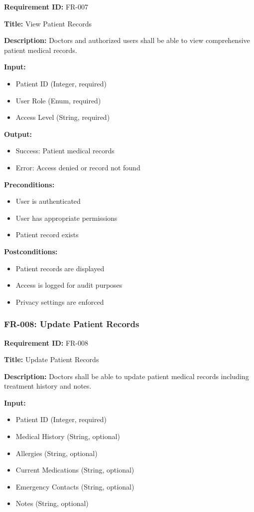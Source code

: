 \documentclass[12pt,a4paper]{article}
\begin{document}
\textbf{Requirement ID:} FR-007

\textbf{Title:} View Patient Records

\textbf{Description:} Doctors and authorized users shall be able to view comprehensive patient medical records.

\textbf{Input:}
\begin{itemize}
    \item Patient ID (Integer, required)
    \item User Role (Enum, required)
    \item Access Level (String, required)
\end{itemize}

\textbf{Output:}
\begin{itemize}
    \item Success: Patient medical records
    \item Error: Access denied or record not found
\end{itemize}

\textbf{Preconditions:}
\begin{itemize}
    \item User is authenticated
    \item User has appropriate permissions
    \item Patient record exists
\end{itemize}

\textbf{Postconditions:}
\begin{itemize}
    \item Patient records are displayed
    \item Access is logged for audit purposes
    \item Privacy settings are enforced
\end{itemize}

\subsubsection{FR-008: Update Patient Records}

\textbf{Requirement ID:} FR-008

\textbf{Title:} Update Patient Records

\textbf{Description:} Doctors shall be able to update patient medical records including treatment history and notes.

\textbf{Input:}
\begin{itemize}
    \item Patient ID (Integer, required)
    \item Medical History (String, optional)
    \item Allergies (String, optional)
    \item Current Medications (String, optional)
    \item Emergency Contacts (String, optional)
    \item Notes (String, optional)
\end{itemize}
\end{document}
